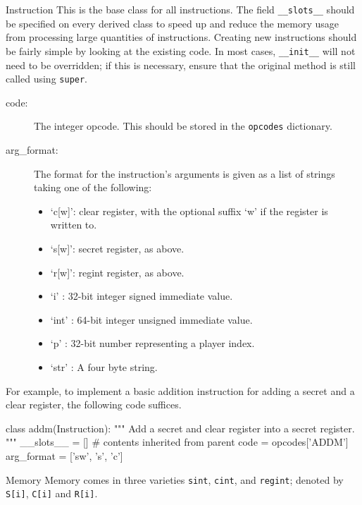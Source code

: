 \begin{class}{Instruction}
This is the base class for all instructions. The field \verb|__slots__| should
be specified on every derived class to speed up and reduce the memory usage from
processing large quantities of instructions. Creating new instructions should
be fairly simple by looking at the existing code. In most cases,
\verb|__init__| will not need to be overridden; if this is necessary, ensure
that the original method is still called using \verb|super|.

\begin{description}
\item[code:] The integer opcode. This should be stored in the \verb|opcodes|
dictionary.
\item[arg_format:] The format for the instruction's arguments is given as a
list of strings taking one of the following:
\begin{itemize}
\item `c[w]': clear register, with the optional suffix `w' if the register is
written to.
\item `s[w]': secret register, as above.
\item `r[w]': regint register, as above.
\item `i'   : 32-bit integer signed immediate value.
\item `int' : 64-bit integer unsigned immediate value.
\item `p'   : 32-bit number representing a player index.
\item `str' : A four byte string.
\end{itemize}
\end{description}

For example, to implement a basic addition instruction for adding a secret
and a clear register, the following code suffices.

\begin{mylisting}
class addm(Instruction):
    """ Add a secret and clear register into a secret register. """
    __slots__ = [] # contents inherited from parent
    code = opcodes['ADDM']
    arg_format = ['sw', 's', 'c']
\end{mylisting}

\end{class}

\begin{class}{Memory}
Memory comes in three varieties \verb+sint+, \verb+cint+, and
\verb+regint+; denoted by \verb+S[i]+, \verb+C[i]+ and \verb+R[i]+.
\end{class}

